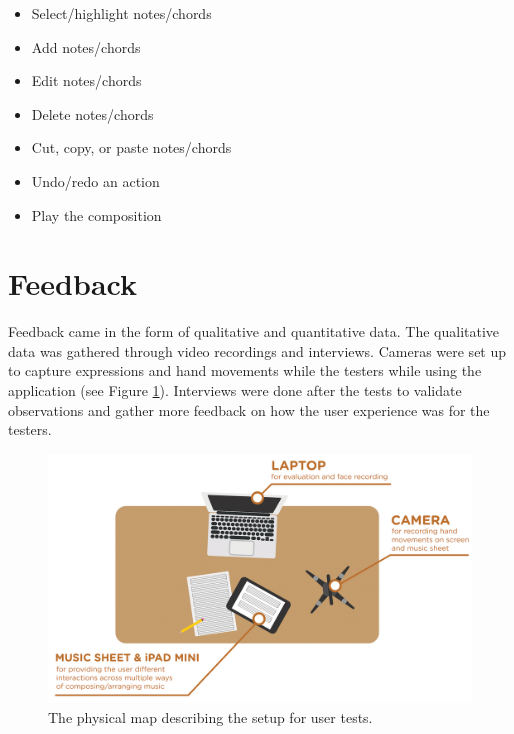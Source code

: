 				\begin{itemize}
					\item Select/highlight notes/chords
				  	\item Add notes/chords
				  	\item Edit notes/chords
				  	\item Delete notes/chords
				  	\item Cut, copy, or paste notes/chords
				  	\item Undo/redo an action
				  	\item Play the composition
				\end{itemize}


	\section{Feedback}

		Feedback came in the form of qualitative and quantitative data. The qualitative data was gathered through video recordings and interviews. Cameras were set up to capture expressions and hand movements while the testers while using the application (see Figure \ref{fig:test_setup}). Interviews were done after the tests to validate observations and gather more feedback on how the user experience was for the testers. 

		\begin{figure}[H]
			\centering
			\includegraphics[scale=0.23]{figures/test_setup.png}
		    \caption{The physical map describing the setup for user tests.}
		    \label{fig:test_setup}
		\end{figure} 

